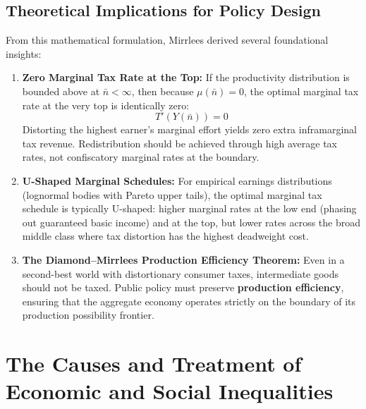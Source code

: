 \documentclass[11pt,a4paper]{article}
\begin{document}
\subsection{Theoretical Implications for Policy Design}
From this mathematical formulation, Mirrlees derived several foundational insights:
\begin{enumerate}
    \item \textbf{Zero Marginal Tax Rate at the Top:} If the productivity distribution is bounded above at $\bar{n} < \infty$, then because $\mu(\bar{n}) = 0$, the optimal marginal tax rate at the very top is identically zero:
    \begin{equation}
    T'(Y(\bar{n})) = 0
    \end{equation}
    Distorting the highest earner's marginal effort yields zero extra inframarginal tax revenue. Redistribution should be achieved through high average tax rates, not confiscatory marginal rates at the boundary.
    \item \textbf{U-Shaped Marginal Schedules:} For empirical earnings distributions (lognormal bodies with Pareto upper tails), the optimal marginal tax schedule is typically U-shaped: higher marginal rates at the low end (phasing out guaranteed basic income) and at the top, but lower rates across the broad middle class where tax distortion has the highest deadweight cost.
    \item \textbf{The Diamond--Mirrlees Production Efficiency Theorem:} Even in a second-best world with distortionary consumer taxes, intermediate goods should not be taxed. Public policy must preserve \textbf{production efficiency}, ensuring that the aggregate economy operates strictly on the boundary of its production possibility frontier.
\end{enumerate}

\section{The Causes and Treatment of Economic and Social Inequalities}
\end{document}
